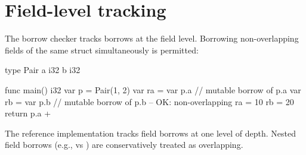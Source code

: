\section{Field-level tracking}
\label{sec:own.fields}

\pnum
The borrow checker tracks borrows at the field level.  Borrowing
non-overlapping fields of the same struct simultaneously is permitted:

\begin{laincode}
type Pair {
    a i32
    b i32
}

func main() i32 {
    var p = Pair(1, 2)
    var ra = var p.a       // mutable borrow of p.a
    var rb = var p.b       // mutable borrow of p.b -- OK: non-overlapping
    ra = 10
    rb = 20
    return p.a +%
}
\end{laincode}

\begin{note}
  The reference implementation tracks field borrows at one level of depth.
  Nested field borrows (e.g.,  vs ) are conservatively
  treated as overlapping.
\end{note}

